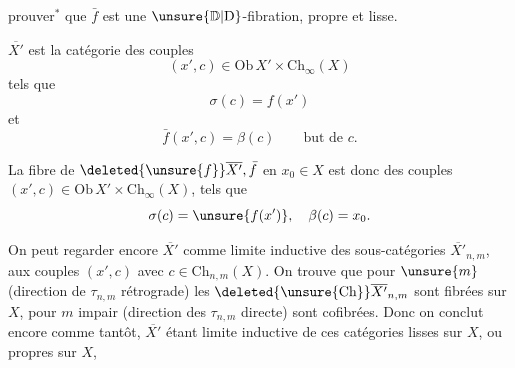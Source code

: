  prouver$^{*}$ que $\bar f$ est une $\unsure{\mathbb D|\mathrm D}$-fibration, propre et lisse. 

$\overline{X'}$ est la catégorie des couples
\[
(x',c)\in\mathrm{Ob}\,X'\times\mathrm{Ch}_{\infty}(X)
\]
tels que
\[
\sigma(c)=f(x')
\]
et
\[
\bar f(x',c)=\beta(c)\qquad\text{but de }c.
\]

La fibre de $\deleted{\unsure{f}}\overline{X'},\bar f$ en $x_0\in X$ est donc  des couples $(x',c)\in\mathrm{Ob}\,X'\times\mathrm{Ch}_{\infty}(X)$, tels que
\[
\sigma(c)=\unsure{f(x')},\quad\beta(c)=x_0.
\]

 On peut regarder encore $\overline{X'}$ comme limite inductive des sous-catégories $\overline{X'}_{n,m}$,  aux couples $(x',c)$ avec $c\in\mathrm{Ch}_{n,m}(X)$. On trouve que pour $\unsure{m}$  (direction  de $\tau_{n,m}$ rétrograde) les $\deleted{\unsure{\mathrm{Ch}}}\overline{X'}_{n,m}$ sont fibrées sur $X$, pour $m$ impair (direction  des $\tau_{n,m}$ directe)  sont cofibrées. Donc on conclut encore comme tantôt,  $\overline{X'}$ étant  limite inductive  de ces catégories lisses sur $X$, ou propres sur $X$,
